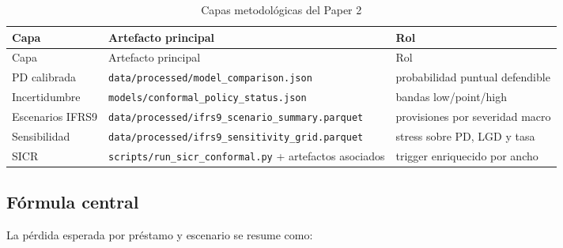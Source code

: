 \documentclass[
  spanish,
  11pt,
  letterpaper,
]{scrbook}
\theoremstyle{plain}
\theoremstyle{remark}
\begin{document}
\begin{longtable}[]{@{}
  >{\raggedright\arraybackslash}p{}
  >{\raggedright\arraybackslash}p{}
  >{\raggedright\arraybackslash}p{}@{}}
\caption{Capas metodológicas del Paper
2}\label{tbl-p2-method}\tabularnewline
\toprule\noalign{}
\begin{minipage}[b]{\linewidth}\raggedright
Capa
\end{minipage} & \begin{minipage}[b]{\linewidth}\raggedright
Artefacto principal
\end{minipage} & \begin{minipage}[b]{\linewidth}\raggedright
Rol
\end{minipage} \\
\midrule\noalign{}
\endfirsthead
\toprule\noalign{}
\begin{minipage}[b]{\linewidth}\raggedright
Capa
\end{minipage} & \begin{minipage}[b]{\linewidth}\raggedright
Artefacto principal
\end{minipage} & \begin{minipage}[b]{\linewidth}\raggedright
Rol
\end{minipage} \\
\midrule\noalign{}
\endhead
\bottomrule\noalign{}
\endlastfoot
PD calibrada & \texttt{data/processed/model\_comparison.json} &
probabilidad puntual defendible \\
Incertidumbre & \texttt{models/conformal\_policy\_status.json} & bandas
low/point/high \\
Escenarios IFRS9 &
\texttt{data/processed/ifrs9\_scenario\_summary.parquet} & provisiones
por severidad macro \\
Sensibilidad & \texttt{data/processed/ifrs9\_sensitivity\_grid.parquet}
& stress sobre PD, LGD y tasa \\
SICR & \texttt{scripts/run\_sicr\_conformal.py} + artefactos asociados &
trigger enriquecido por ancho \\
\end{longtable}

\subsection{Fórmula central}\label{fuxf3rmula-central}

La pérdida esperada por préstamo y escenario se resume como:
\end{document}

